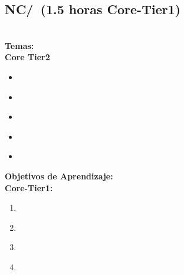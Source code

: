 
\subsection{NC/\NCIntroduction~(1.5 horas Core-Tier1)}\label{sec:BOK:NCIntroduction}
\NCIntroductionDescription\\
\noindent \textbf{Temas:}\\
\noindent \textbf{Core Tier2}
\begin{itemize}
	\item \NCIntroductionTopicOrganization\label{sec:BOK:NCIntroductionTopicOrganization}
	\item \NCIntroductionTopicSwitching\label{sec:BOK:NCIntroductionTopicSwitching}
	\item \NCIntroductionTopicPhysical\label{sec:BOK:NCIntroductionTopicPhysical}
	\item \NCIntroductionTopicLayering\label{sec:BOK:NCIntroductionTopicLayering}
	\item \NCIntroductionTopicRoles\label{sec:BOK:NCIntroductionTopicRoles}
\end{itemize}


\noindent \textbf{Objetivos de Aprendizaje:}\\
\noindent \textbf{Core-Tier1:}
\begin{enumerate}
	\setcounter{enumi}{0}
	\item \NCIntroductionLOArticulateThe\xspace[\NCIntroductionLOArticulateTheLevel]\label{sec:BOK:NCIntroductionLOArticulateThe}
	\item \NCIntroductionLOListAndAppropriate\xspace[\NCIntroductionLOListAndAppropriateLevel]\label{sec:BOK:NCIntroductionLOListAndAppropriate}
	\item \NCIntroductionLODescribeTheOfNetworked\xspace[\NCIntroductionLODescribeTheOfNetworkedLevel]\label{sec:BOK:NCIntroductionLODescribeTheOfNetworked}
	\item \NCIntroductionLOIdentifyTheOfA\xspace[\NCIntroductionLOIdentifyTheOfALevel]\label{sec:BOK:NCIntroductionLOIdentifyTheOfA}
\end{enumerate}


